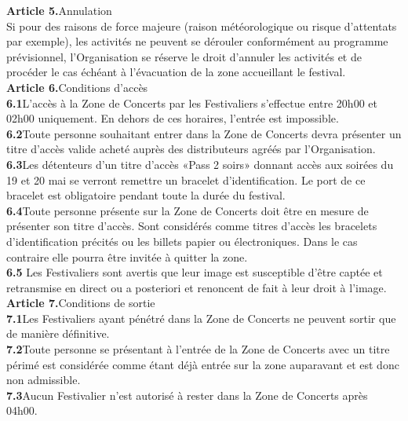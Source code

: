 \documentclass[hidelinks, paper=a4, fontsize=13pt]{report}
\begin{document}
\textbf{Article 5.}\hspace{3mm}Annulation\\
Si pour des raisons de force majeure (raison météorologique ou risque d'attentats par exemple), les activités ne peuvent se dérouler conformément au programme prévisionnel, l'Organisation se réserve le droit d’annuler les activités et de procéder le cas échéant à l’évacuation de la zone accueillant le festival.\\


\textbf{Article 6.}\hspace{3mm}Conditions d’accès\\
\textbf{6.1}\hspace{3mm}L’accès à la Zone de Concerts par les Festivaliers s’effectue entre 20h00 et 02h00 uniquement. En dehors de ces horaires, l’entrée est impossible. \\
\textbf{6.2}\hspace{3mm}Toute personne souhaitant entrer dans la Zone de Concerts devra présenter un titre d’accès valide acheté auprès des distributeurs agréés par l’Organisation.\\
\textbf{6.3}\hspace{3mm}Les détenteurs d’un titre d’accès «Pass 2 soirs» donnant accès aux soirées du 19 et 20 mai se verront remettre un bracelet d’identification. Le port de ce bracelet est obligatoire pendant toute la durée du festival.\\
\textbf{6.4}\hspace{3mm}Toute personne présente sur la Zone de Concerts doit être en mesure de présenter son titre d’accès. Sont considérés comme titres d’accès les bracelets d’identification précités ou les billets papier ou électroniques. Dans le cas contraire elle pourra être invitée à quitter la zone.\\
\textbf{6.5}\hspace{3mm} Les Festivaliers sont avertis que leur image est susceptible d'être captée et retransmise en direct ou a posteriori et renoncent de fait à leur droit à l'image.\\



\textbf{Article 7.}\hspace{3mm}Conditions de sortie\\
\textbf{7.1}\hspace{3mm}Les Festivaliers ayant pénétré dans la Zone de Concerts ne peuvent sortir que de manière définitive. \\
\textbf{7.2}\hspace{3mm}Toute personne se présentant à l’entrée de la Zone de Concerts avec un titre périmé est considérée comme étant déjà entrée sur la zone auparavant et est donc non admissible.\\
\textbf{7.3}\hspace{3mm}Aucun Festivalier n’est autorisé à rester dans la Zone de Concerts après 04h00. \\
\end{document}
